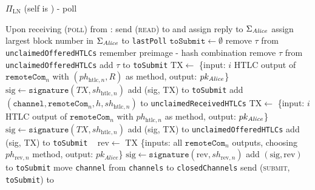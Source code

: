 \begin{protocolbox}{$\Pi_{\mathrm{LN}}$ (self is \alice) - poll}
  \label{alg:protocol:poll}
  \begin{algorithmic}[1]
    \State Upon receiving (\textsc{poll}) from \environment:
    \Indent
      \State send (\textsc{read}) to \ledger{} and assign reply to
      $\Sigma_{\mathit{Alice}}$
      \State assign largest block number in $\Sigma_{\mathit{Alice}}$ to
      \texttt{lastPoll}
    \State $\mathtt{toSubmit} \gets \emptyset$
         
          \State remove $\tau$ from \texttt{unclaimedOfferedHTLCs}
          \State remember preimage - hash combination
          \State remove $\tau$ from \texttt{unclaimedOfferedHTLCs}
          \State add $\tau$ to \texttt{toSubmit}
        \EndIf
      \EndFor
         
              \State $\mathrm{TX} \gets$ \{input: $i$ HTLC output of
              $\mathtt{remoteCom}_n$ with $\left(ph_{\mathrm{htlc}, n},
              R\right)$ as method, output: $pk_{\mathit{Alice}}$\}
              \State $\mathrm{sig} \gets \mathtt{signature}\left(TX,
              sh_{\mathrm{htlc}, n}\right)$
              \State add (sig, TX) to \texttt{toSubmit}
            \Else
              \State add $\left(\texttt{channel}, \mathtt{remoteCom}_n, h,
              sh_{\mathrm{htlc}, n}\right)$ to \texttt{unclaimedReceivedHTLCs}
            \EndIf
          \EndFor
            \State $\mathrm{TX} \gets$ \{input: $i$ HTLC output of
            $\mathtt{remoteCom}_n$ with $ph_{\mathrm{htlc}, n}$ as method,
            output: $pk_{\mathit{Alice}}$\}
            \State $\mathrm{sig} \gets \mathtt{signature}\left(TX,
            sh_{\mathrm{htlc}, n}\right)$
              \State add (sig, TX) to \texttt{unclaimedOfferedHTLCs}
              \State add (sig, TX) to \texttt{toSubmit}
            \EndIf
          \EndFor
        \Else \ 
          \State $\mathrm{rev} \gets$ TX \{inputs: all $\mathtt{remoteCom}_n$
          outputs, choosing $ph_{\mathrm{rev}, n}$ method, output:
          $pk_{\mathit{Alice}}$\}
          \State $\mathrm{sig} \gets \mathtt{signature}\left(\mathrm{rev},
          sh_{\mathrm{rev}, n}\right)$
          \State add $\left(\mathrm{sig}, \mathrm{rev}\right)$ to
          \texttt{toSubmit}
        \EndIf
        \State move \texttt{channel} from \texttt{channels} to
        \texttt{closedChannels}
      \EndFor
      \State send (\textsc{submit}, \texttt{toSubmit}) to \ledger
    \EndIndent
    \State
  \end{algorithmic}
\end{protocolbox}

